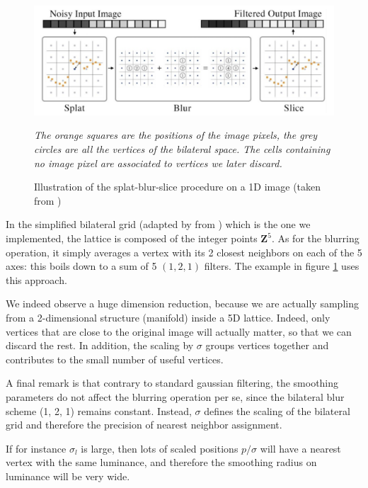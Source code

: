 \documentclass{article}
\begin{document}
\begin{figure}
    \centering
    \includegraphics[width=\linewidth]{pictures/SBS.png}
    \caption{Illustration of the splat-blur-slice procedure on a 1D image (taken from \cite{barron_fast_2015})}
    {\small \it The orange squares are the positions of the image pixels, the grey circles are all the vertices of the bilateral space. The cells containing no image pixel are associated to vertices we later discard.
    }
    \label{fig:SBS}
\end{figure}

\medskip

In the simplified bilateral grid (adapted by \cite{barron_fast_2015} from \cite{chen_real-time_2007}) which is the one we implemented, the lattice is composed of the integer points $\textbf{Z}^5$. As for the blurring operation, it simply averages a vertex with its 2 closest neighbors on each of the 5 axes: this boils down to a sum of 5 $(1, 2, 1)$ filters. The example in figure \ref{fig:SBS} uses this approach.

We indeed observe a huge dimension reduction, because we are actually sampling from a 2-dimensional structure (manifold) inside a 5D lattice. Indeed, only vertices that are close to the original image will actually matter, so that we can discard the rest. In addition, the scaling by $\sigma$ groups vertices together and contributes to the small number of useful vertices.

\medskip

A final remark is that contrary to standard gaussian filtering, the smoothing parameters do not affect the blurring operation per se, since the bilateral blur scheme (1, 2, 1) remains constant. Instead, $\sigma$ defines the scaling of the bilateral grid and therefore the precision of nearest neighbor assignment.

If for instance $\sigma_l$ is large, then lots of scaled positions $p / \sigma$ will have a nearest vertex with the same luminance, and therefore the smoothing radius on luminance will be very wide.
\end{document}
